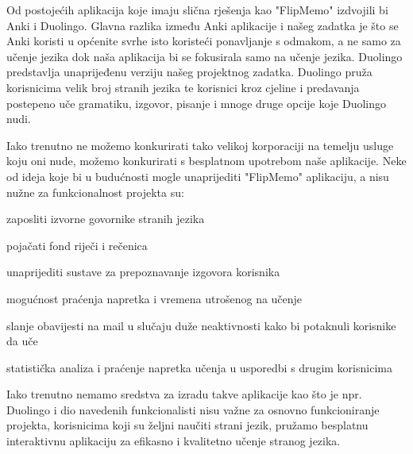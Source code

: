 Od postojećih aplikacija koje imaju slična rješenja kao "FlipMemo" izdvojili bi Anki i Duolingo. Glavna razlika između Anki aplikacije i našeg zadatka je što se Anki koristi u općenite svrhe isto koristeći ponavljanje s odmakom, a ne samo za učenje jezika dok naša aplikacija bi se fokusirala samo na učenje jezika. Duolingo predstavlja unaprijeđenu verziju našeg projektnog zadatka. Duolingo pruža korisnicima velik broj stranih jezika te korisnici kroz cjeline i predavanja postepeno uče gramatiku, izgovor, pisanje i mnoge druge opcije koje Duolingo nudi. 

Iako trenutno ne možemo konkurirati tako velikoj korporaciji na temelju usluge koju oni nude, možemo konkurirati s besplatnom upotrebom naše aplikacije. Neke od ideja koje bi u budućnosti mogle unaprijediti "FlipMemo" aplikaciju, a nisu nužne za funkcionalnost projekta su:

\begin{packed_item}
	\item  zaposliti izvorne govornike stranih jezika 
	\item  pojačati fond riječi i rečenica
	\item  unaprijediti sustave za prepoznavanje izgovora korisnika
	\item  mogućnost praćenja napretka i vremena utrošenog na učenje 
	\item  slanje obavijesti na mail u slučaju duže neaktivnosti kako bi potaknuli korisnike da uče
	\item  statistička analiza i praćenje napretka učenja u usporedbi s drugim korisnicima 
\end{packed_item}

Iako trenutno nemamo sredstva za izradu takve aplikacije kao što je npr. Duolingo i dio navedenih funkcionalisti nisu važne za osnovno funkcioniranje projekta, korisnicima koji su željni naučiti strani jezik, pružamo besplatnu interaktivnu aplikaciju za efikasno i kvalitetno učenje stranog jezika.

	